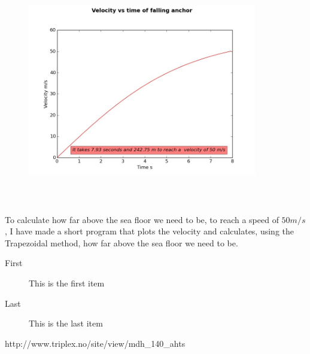 \documentclass[DIV=calc, paper=a4, fontsize=13pt, twocolumn]{scrartcl}	 %
\begin{document}
\begin{figure}[t]
\includegraphics[width=10cm,height=10cm]{velocity_plot.jpg}
\end{figure}
To calculate how far above the sea floor we need to be, to reach a speed of $50 m/s $, I have made a short program that plots the velocity and calculates, using the Trapezoidal method, how far above the sea floor we need to be. 











\begin{description}
\item[First] This is the first item
\item[Last] This is the last item
\end{description}



\begin{thebibliography}{99} %


\newblock http://www.triplex.no/site/view/mdh\_140\_ahts
 
\end{thebibliography}


\end{document}

